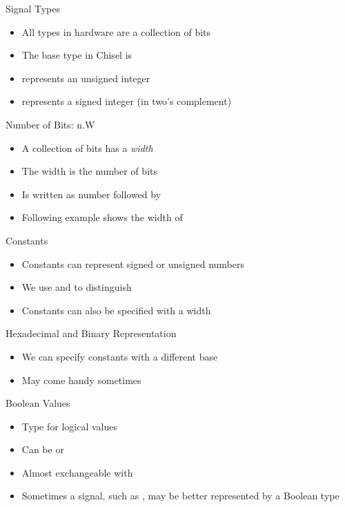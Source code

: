 \begin{frame}[fragile]{Signal Types}
\begin{itemize}
\item All types in hardware are a collection of bits
\item The base type in Chisel is 
\item {} represents an unsigned integer
\item {} represents a signed integer (in two's complement)
\end{itemize}
\end{frame}

\begin{frame}[fragile]{Number of Bits: n.W}
\begin{itemize}
\item A collection of bits has a \emph{width}
\item The width is the number of bits
\item Is written as number followed by 
\item Following example shows the width of 
\end{itemize}
\end{frame}

\begin{frame}[fragile]{Constants}
\begin{itemize}
\item Constants can represent signed or unsigned numbers
\item We use  and  to distinguish
\end{itemize}
\begin{itemize}
\item Constants can also be specified with a width
\end{itemize}
\end{frame}

\begin{frame}[fragile]{Hexadecimal and Binary Representation}
\begin{itemize}
\item We can specify constants with a different base
\item May come handy sometimes
\end{itemize}
\end{frame}

\begin{frame}[fragile]{Boolean Values}
\begin{itemize}
\item Type for logical values
\item Can be  or 
\item Almost exchangeable with 
\item Sometimes a signal, such as , may be better represented by a Boolean type
\end{itemize}
\end{frame}

